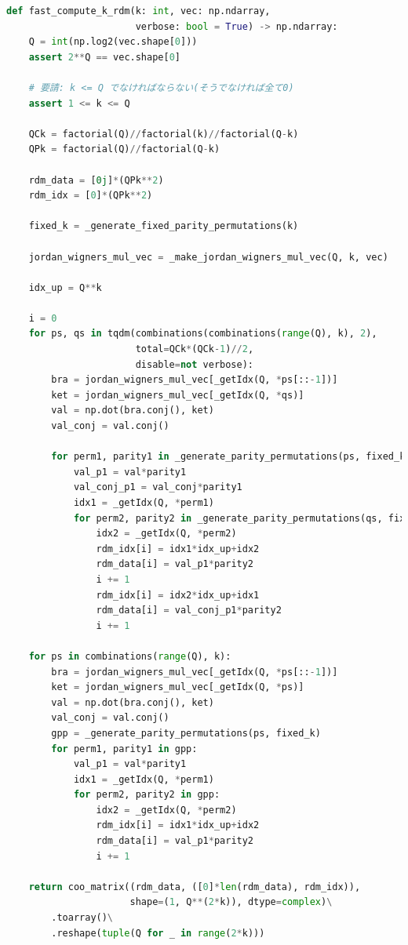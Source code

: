 \documentclass[a4paper, 10pt, dvipdfmx]{jlreq}
\begin{document}
\begin{lstlisting}[caption=kRDM, label=code:kRDM, language=Python]
def fast_compute_k_rdm(k: int, vec: np.ndarray,
                       verbose: bool = True) -> np.ndarray:
    Q = int(np.log2(vec.shape[0]))
    assert 2**Q == vec.shape[0]

    # 要請: k <= Q でなければならない(そうでなければ全て0)
    assert 1 <= k <= Q

    QCk = factorial(Q)//factorial(k)//factorial(Q-k)
    QPk = factorial(Q)//factorial(Q-k)

    rdm_data = [0j]*(QPk**2)
    rdm_idx = [0]*(QPk**2)

    fixed_k = _generate_fixed_parity_permutations(k)

    jordan_wigners_mul_vec = _make_jordan_wigners_mul_vec(Q, k, vec)

    idx_up = Q**k

    i = 0
    for ps, qs in tqdm(combinations(combinations(range(Q), k), 2),
                       total=QCk*(QCk-1)//2,
                       disable=not verbose):
        bra = jordan_wigners_mul_vec[_getIdx(Q, *ps[::-1])]
        ket = jordan_wigners_mul_vec[_getIdx(Q, *qs)]
        val = np.dot(bra.conj(), ket)
        val_conj = val.conj()

        for perm1, parity1 in _generate_parity_permutations(ps, fixed_k):
            val_p1 = val*parity1
            val_conj_p1 = val_conj*parity1
            idx1 = _getIdx(Q, *perm1)
            for perm2, parity2 in _generate_parity_permutations(qs, fixed_k):
                idx2 = _getIdx(Q, *perm2)
                rdm_idx[i] = idx1*idx_up+idx2
                rdm_data[i] = val_p1*parity2
                i += 1
                rdm_idx[i] = idx2*idx_up+idx1
                rdm_data[i] = val_conj_p1*parity2
                i += 1

    for ps in combinations(range(Q), k):
        bra = jordan_wigners_mul_vec[_getIdx(Q, *ps[::-1])]
        ket = jordan_wigners_mul_vec[_getIdx(Q, *ps)]
        val = np.dot(bra.conj(), ket)
        val_conj = val.conj()
        gpp = _generate_parity_permutations(ps, fixed_k)
        for perm1, parity1 in gpp:
            val_p1 = val*parity1
            idx1 = _getIdx(Q, *perm1)
            for perm2, parity2 in gpp:
                idx2 = _getIdx(Q, *perm2)
                rdm_idx[i] = idx1*idx_up+idx2
                rdm_data[i] = val_p1*parity2
                i += 1

    return coo_matrix((rdm_data, ([0]*len(rdm_data), rdm_idx)),
                      shape=(1, Q**(2*k)), dtype=complex)\
        .toarray()\
        .reshape(tuple(Q for _ in range(2*k)))
\end{lstlisting}
\end{document}
